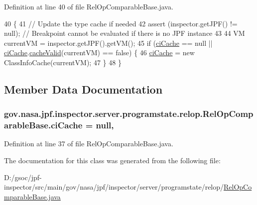 Definition at line 40 of file Rel\+Op\+Comparable\+Base.\+java.


\begin{DoxyCode}
40                                                                \{
41     \textcolor{comment}{// Update the type cache if needed}
42     assert (inspector.getJPF() != null); \textcolor{comment}{// Breakpoint cannot be evaluated if there is no JPF instance}
43 
44     VM currentVM = inspector.getJPF().getVM();
45     \textcolor{keywordflow}{if} (\hyperlink{classgov_1_1nasa_1_1jpf_1_1inspector_1_1server_1_1programstate_1_1relop_1_1_rel_op_comparable_base_a3bd22b88a44dff54d68b1d8a3e8f3d0a}{ciCache} == null || \hyperlink{classgov_1_1nasa_1_1jpf_1_1inspector_1_1server_1_1programstate_1_1relop_1_1_rel_op_comparable_base_a3bd22b88a44dff54d68b1d8a3e8f3d0a}{ciCache}.\hyperlink{classgov_1_1nasa_1_1jpf_1_1inspector_1_1utils_1_1_class_info_cache_ac71fb1624b72457166c1326d44fb50c5}{cacheValid}(currentVM) == \textcolor{keyword}{false}) \{
46       \hyperlink{classgov_1_1nasa_1_1jpf_1_1inspector_1_1server_1_1programstate_1_1relop_1_1_rel_op_comparable_base_a3bd22b88a44dff54d68b1d8a3e8f3d0a}{ciCache} = \textcolor{keyword}{new} ClassInfoCache(currentVM);
47     \}
48   \}
\end{DoxyCode}


\subsection{Member Data Documentation}
\subsubsection[{\texorpdfstring{ci\+Cache}{ciCache}}]{ gov.\+nasa.\+jpf.\+inspector.\+server.\+programstate.\+relop.\+Rel\+Op\+Comparable\+Base.\+ci\+Cache = null\hspace{0.3cm}{\ttfamily [static]}, {\ttfamily [protected]}}\hypertarget{classgov_1_1nasa_1_1jpf_1_1inspector_1_1server_1_1programstate_1_1relop_1_1_rel_op_comparable_base_a3bd22b88a44dff54d68b1d8a3e8f3d0a}{}\label{classgov_1_1nasa_1_1jpf_1_1inspector_1_1server_1_1programstate_1_1relop_1_1_rel_op_comparable_base_a3bd22b88a44dff54d68b1d8a3e8f3d0a}


Definition at line 37 of file Rel\+Op\+Comparable\+Base.\+java.



The documentation for this class was generated from the following file\+:\begin{DoxyCompactItemize}
\item 
D\+:/gsoc/jpf-\/inspector/src/main/gov/nasa/jpf/inspector/server/programstate/relop/\hyperlink{_rel_op_comparable_base_8java}{Rel\+Op\+Comparable\+Base.\+java}\end{DoxyCompactItemize}

